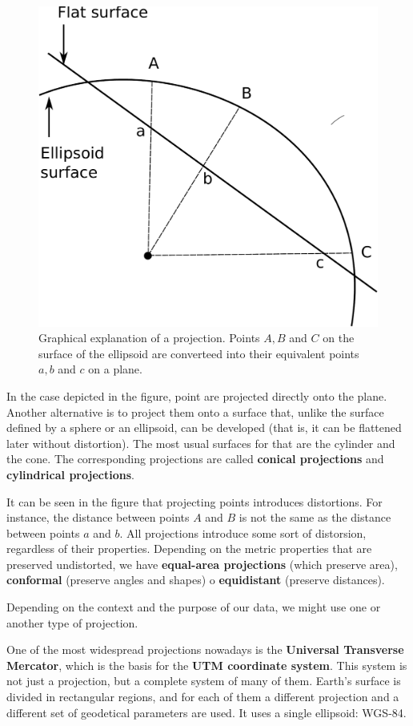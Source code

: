 \begin{figure}
\centering
\includegraphics[width=.5\columnwidth]{Cartography/Projection.pdf}
\caption{\small Graphical explanation of a projection. Points $A, B$ and $C$ on the surface of the ellipsoid are converteed into their equivalent points $a, b$ and $c$ on a plane.}
\label{Fig:Projection} 
\end{figure}

In the case depicted in the figure, point are projected directly onto the plane. Another alternative is to project them onto a surface that, unlike the surface defined by a sphere or an ellipsoid, can be developed (that is, it can be flattened later without distortion). The most usual surfaces for that are the cylinder and the cone. The corresponding projections are called \textbf{conical projections} and \textbf{cylindrical projections}.

It can be seen in the figure that projecting points introduces distortions. For instance, the distance between points $A$ and $B$ is not the same as the distance between points $a$ and $b$. All projections introduce some sort of distorsion, regardless of their properties. Depending on the metric properties that are preserved undistorted, we have \textbf{equal-area projections} (which preserve area), \textbf{conformal} (preserve angles and shapes) o \textbf{equidistant} (preserve distances).

Depending on the context and the purpose of our data, we might use one or another type of projection. 

One of the most widespread projections nowadays is the \textbf{Universal Transverse Mercator}, which is the basis for the \textbf{UTM coordinate system}. This system is not just a projection, but a complete system of many of them. Earth's surface is divided in rectangular regions, and for each of them a different projection and a different set of geodetical parameters are used. It uses a single ellipsoid: WGS-84.


